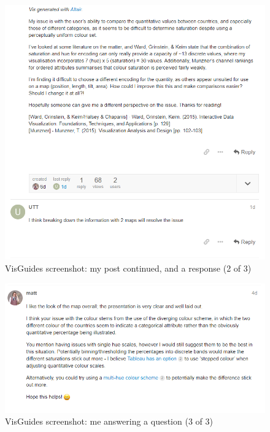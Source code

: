 \begin{figure}[ht]
    \centering
    \includegraphics[width=\textwidth]{../img/t3_2}
    \caption{VisGuides screenshot: my post continued, and a response (2 of 3)}
\end{figure}
\begin{figure}[ht]
    \centering
    \includegraphics[width=\textwidth]{../img/t3_3}
    \caption{VisGuides screenshot: me answering a question (3 of 3)}
\end{figure}